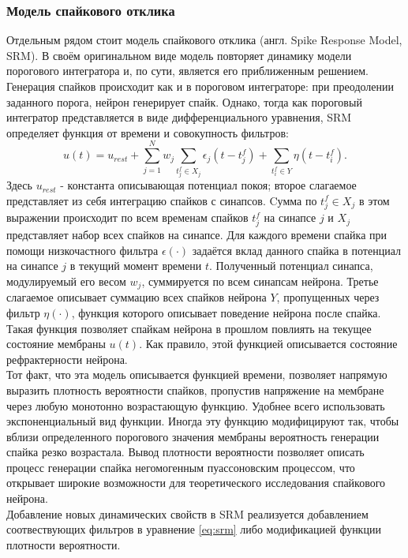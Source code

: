 \documentclass[a4paper,10pt]{article}
\begin{document}
\subsubsection{Модель спайкового отклика}\label{sec:srm}
\indent Отдельным рядом стоит модель спайкового отклика (англ. Spike Response Model, SRM). В своём оригинальном виде модель повторяет динамику модели порогового интегратора и, по сути, является его приближенным решением.\\ 
\indent Генерация спайков происходит как и в пороговом интеграторе: при преодолении заданного порога, нейрон генерирует спайк. Однако, тогда как пороговый интегратор представляется в виде дифференциального уравнения, SRM определяет функция от времени и совокупность фильтров:
\begin{equation}\label{eq:srm}
u(t) = u_{rest} + \sum_{j=1}^N w_{j} \sum_{t^{f}_{j} \in X_{j}} \epsilon_{j}(t-t^{f}_{j}) + \sum_{t^{f}_{i}\in Y}\eta(t-t^{f}_{i}).
\end{equation}
Здесь $u_{rest}$ - константа описывающая потенциал покоя; второе слагаемое представляет из себя интеграцию спайков с синапсов. Cумма по $t^{f}_{j} \in X_{j}$ в этом выражении происходит по всем временам спайков $t^{f}_{j}$ на синапсе $j$ и $X_{j}$ представляет набор всех спайков на синапсе. Для каждого времени спайка при помощи низкочастного фильтра $\epsilon(\cdot)$ задаётся вклад данного спайка в потенциал на синапсе $j$ в текущий момент времени $t$. Полученный потенциал синапса, модулируемый его весом $w_{j}$, суммируется по всем синапсам нейрона. Третье слагаемое описывает суммацию всех спайков нейрона $Y$, пропущенных через фильтр $\eta(\cdot)$, функция которого описывает поведение нейрона после спайка. Такая функция позволяет спайкам нейрона в прошлом повлиять на текущее состояние мембраны $u(t)$. Как правило, этой функцией описывается состояние рефрактерности нейрона.\\
\indent Тот факт, что эта модель описывается функцией времени, позволяет напрямую выразить плотность вероятности спайков, пропустив напряжение на мембране через любую монотонно возрастающую функцию. Удобнее всего использовать экспоненциальный вид функции. Иногда эту функцию модифицируют так, чтобы вблизи определенного порогового значения мембраны вероятность генерации спайка резко возрастала. Вывод плотности вероятности позволяет описать процесс генерации спайка негомогенным пуассоновским процессом, что открывает широкие возможности для теоретического исследования спайкового нейрона.\\
\indent Добавление новых динамических свойств в SRM реализуется добавлением соотвествующих фильтров в уравнение \eqref{eq:srm} либо модификацией функции плотности вероятности\cite{TripleAdapt,AdaptThesis}. 
\end{document}
